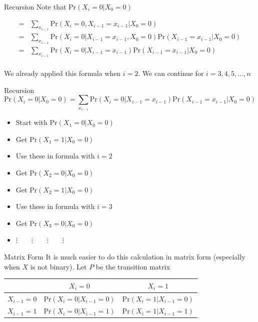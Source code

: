 \documentclass[10pt]{beamer}
\begin{document}
\begin{frame}{Recursion}
Note that $\mbox{Pr}(X_i=0|X_0=0)$

\begin{align*}
=&\sum_{x_{i-1}}\mbox{Pr}(X_i=0,X_{i-1}=x_{i-1}|X_0=0)\\
=&\sum_{x_{i-1}}\mbox{Pr}(X_i=0|X_{i-1}=x_{i-1},X_0=0)\mbox{Pr}(X_{i-1}=x_{i-1}|X_0=0)\\
=&\sum_{x_{i-1}}\mbox{Pr}(X_i=0|X_{i-1}=x_{i-1})\mbox{Pr}(X_{i-1}=x_{i-1}|X_0=0)\\
\end{align*}

We already applied this formula when $i=2$.  We can continue for $i=3,4,5,\ldots,n$
\end{frame}
\begin{frame}{Recursion}
\begin{equation*}
\mbox{Pr}(X_i=0|X_0=0)=\sum_{x_{i-1}}\mbox{Pr}(X_i=0|X_{i-1}=x_{i-1})\mbox{Pr}(X_{i-1}=x_{i-1}|X_0=0)
\end{equation*}

\begin{itemize}
\item Start with $\mbox{Pr}(X_1=0|X_0=0)$

\item Get $\mbox{Pr}(X_1=1|X_0=0)$

\item Use these in formula with $i=2$

\item Get $\mbox{Pr}(X_2=0|X_0=0)$

\item Get $\mbox{Pr}(X_2=1|X_0=0)$

\item Use these in formula with $i=3$

\item Get $\mbox{Pr}(X_3=0|X_0=0)$

\item $\vdots\quad\quad\vdots\quad\quad\vdots\quad\quad\vdots$
\end{itemize}
\end{frame}
\begin{frame}{Matrix Form}
It is much easier to do this calculation in matrix form (especially when $X$ is not binary).  Let $P$ be the transition matrix

\begin{table}
\begin{center}
\begin{tabular}{c|cc}
& $X_{i}=0$ & $X_{i}=1$\\
\hline
$X_{i-1}=0$ & $\mbox{Pr}(X_{i}=0|X_{i-1}=0)$ & $\mbox{Pr}(X_{i}=1|X_{i-1}=0)$\\
$X_{i-1}=1$ & $\mbox{Pr}(X_{i}=0|X_{i-1}=1)$ & $\mbox{Pr}(X_{i}=1|X_{i-1}=1)$\\
\end{tabular}
\end{center}
\end{table}
\end{frame}
\end{document}
